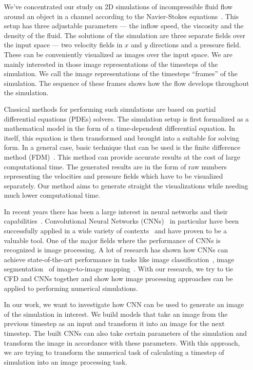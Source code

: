 \documentclass{llncs}
\begin{document}
We've concentrated our study on 2D simulations of incompressible fluid flow around an object in a channel according to the Navier-Stokes equations~\cite{bistafa2018}. This setup has three adjustable parameters --- the inflow speed, the viscosity and the density of the fluid. The solutions of the simulation are three separate fields over the input space --- two velocity fields in $x$ and $y$ directions and a pressure field. These can be conveniently visualized as images over the input space. We are mainly interested in those image representations of the timesteps of the simulation. We call the image representations of the timesteps ``frames'' of the simulation. The sequence of these frames shows how the flow develops throughout the simulation.

Classical methods for performing such simulations are based on partial differential equations (PDEs) solvers. The simulation setup is first formalized as a mathematical model in the form of a time-dependent differential equation. In itself, this equation is then transformed and brought into a suitable for solving form. In a general case, basic technique that can be used is the finite difference method (FDM)~\cite{bashar2011,petersson2018,zhang2014,nahit2011}. This method can provide accurate results at the cost of large computational time. The generated results are in the form of raw numbers representing the velocities and pressure fields which have to be visualized separately. Our method aims to generate straight the visualizations while needing much lower computational time.

In recent years there has been a large interest in neural networks and their capabilities~\cite{krizhevsky2012,simonyan2014,zeiler2011,liu2017,ronneberger2015}. Convolutional Neural Networks (CNNs)~\cite{long2014} in particular have been successfully applied in a wide variety of contexts~\cite{eremeev2019,schulz2019,zhangyang2019,yang2019} and have proven to be a valuable tool. One of the major fields where the performance of CNNs is recognized is image processing. A lot of research has shown how CNNs can achieve state-of-the-art performance in tasks like image classification~\cite{xie2019,xie2016aggregated,he2015}, image segmentation~\cite{xie2016aggregated,choi2020cars} of image-to-image mapping~\cite{liu2017,radford2015,park2019}. With our research, we try to tie CFD and CNNs together and show how image processing approaches can be applied to performing numerical simulations.

In our work, we want to investigate how CNN can be used to generate an image of the simulation in interest. We build models that take an image from the previous timestep as an input and transform it into an image for the next timestep. The built CNNs can also take certain parameters of the simulation and transform the image in accordance with these parameters. With this approach, we are trying to transform the numerical task of calculating a timestep of simulation into an image processing task.
\end{document}
